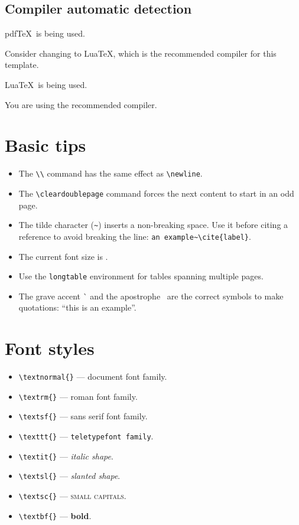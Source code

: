 \subsection{Compiler automatic detection}

\ifPDFTeX
{\color{red} pdf\TeX\ is being used.}

Consider changing to Lua\TeX, which is the recommended compiler for this template.
\fi

\ifLuaTeX
{\color{Green4} Lua\TeX\ is being used.}

You are using the recommended compiler.
\fi


\section{Basic tips}
\label{c2:s:basic-tips}

\begin{itemize}
\item
The \verb+\\+ command has the same effect as \verb+\newline+.
\item
The \verb+\cleardoublepage+ command forces the next content to start in an odd page.
\item
The tilde character (\verb+~+) inserts a non-breaking space.
Use it before citing a reference to avoid breaking the line: \verb+an example~\cite{label}+.
\item
The current font size is \myfontsize.
\item
Use the \verb+longtable+ environment for tables spanning multiple pages.
\item
The grave accent \`{} and the apostrophe \textquotesingle\ are the correct symbols to make quotations: ``this is an example''.
\end{itemize}


\section{Font styles}
\label{c2:s:font-styles}

\begin{itemize}
\item
\verb+\textnormal{}+ --- \textnormal{document font family}.
\item
\verb+\textrm{}+ --- \textrm{roman font family}.
\item
\verb+\textsf{}+ --- \textsf{sans serif font family}.
\item
\verb+\texttt{}+ --- \texttt{teletypefont family}.
\item
\verb+\textit{}+ --- \textit{italic shape}.
\item
\verb+\textsl{}+ --- \textsl{slanted shape}.
\item
\verb+\textsc{}+ --- \textsc{small capitals}.
\item
\verb+\textbf{}+ --- \textbf{bold}.
\end{itemize}


